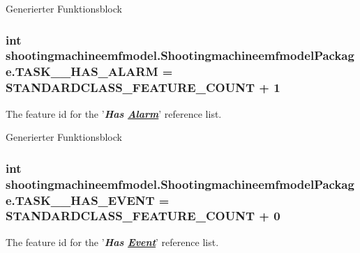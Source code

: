 Generierter Funktionsblock  \hypertarget{interfaceshootingmachineemfmodel_1_1_shootingmachineemfmodel_package_a86b86fa479cfc7162ae9b30bf99faa27}{
\subsubsection[{T\-A\-S\-K\-\_\-\-\_\-\-H\-A\-S\-\_\-\-A\-L\-A\-R\-M}]{\setlength{\rightskip}{0pt plus 5cm}int shootingmachineemfmodel.\-Shootingmachineemfmodel\-Package.\-T\-A\-S\-K\-\_\-\-\_\-\-H\-A\-S\-\_\-\-A\-L\-A\-R\-M = {\bf S\-T\-A\-N\-D\-A\-R\-D\-C\-L\-A\-S\-S\-\_\-\-F\-E\-A\-T\-U\-R\-E\-\_\-\-C\-O\-U\-N\-T} + 1}}\label{interfaceshootingmachineemfmodel_1_1_shootingmachineemfmodel_package_a86b86fa479cfc7162ae9b30bf99faa27}
The feature id for the '{\itshape {\bfseries Has \hyperlink{interfaceshootingmachineemfmodel_1_1_alarm}{Alarm}}}' reference list.

Generierter Funktionsblock  \hypertarget{interfaceshootingmachineemfmodel_1_1_shootingmachineemfmodel_package_ab400549825734d82cb9b6835551aacc6}{
\subsubsection[{T\-A\-S\-K\-\_\-\-\_\-\-H\-A\-S\-\_\-\-E\-V\-E\-N\-T}]{\setlength{\rightskip}{0pt plus 5cm}int shootingmachineemfmodel.\-Shootingmachineemfmodel\-Package.\-T\-A\-S\-K\-\_\-\-\_\-\-H\-A\-S\-\_\-\-E\-V\-E\-N\-T = {\bf S\-T\-A\-N\-D\-A\-R\-D\-C\-L\-A\-S\-S\-\_\-\-F\-E\-A\-T\-U\-R\-E\-\_\-\-C\-O\-U\-N\-T} + 0}}\label{interfaceshootingmachineemfmodel_1_1_shootingmachineemfmodel_package_ab400549825734d82cb9b6835551aacc6}
The feature id for the '{\itshape {\bfseries Has \hyperlink{interfaceshootingmachineemfmodel_1_1_event}{Event}}}' reference list.

